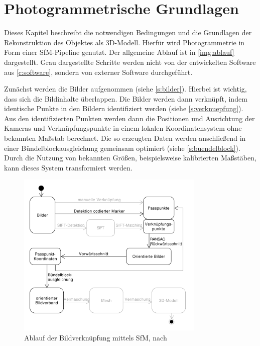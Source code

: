 \documentclass[./00PhotoBox.tex]{subfiles}
\begin{document}
\chapter{Photogrammetrische Grundlagen}
\label{c:photogrammetrie}
Dieses Kapitel beschreibt die notwendigen Bedingungen und die Grundlagen der Rekonstruktion des Objektes als 3D-Modell. Hierfür wird Photogrammetrie in Form einer \Gls{SfM}-Pipeline genutzt. Der allgemeine Ablauf ist in \autoref{img:ablauf} dargestellt. Grau dargestellte Schritte werden nicht von der entwickelten Software aus \autoref{c:software}, sondern von externer Software durchgeführt.

Zunächst werden die Bilder aufgenommen (siehe \autoref{s:bilder}). Hierbei ist wichtig, dass sich die Bildinhalte überlappen. Die Bilder werden dann verknüpft, indem identische Punkte in den Bildern identifiziert werden  (siehe \autoref{s:verknuepfung}).
Aus den identifizierten Punkten werden dann die Positionen und Ausrichtung der Kameras und Verknüpfungspunkte in einem lokalen Koordinatensystem ohne bekannten Maßstab berechnet. Die so erzeugten Daten werden anschließend in einer Bündelblockausgleichung gemeinsam optimiert (siehe \autoref{s:buendelblock}). Durch die Nutzung von bekannten Größen, beispielsweise kalibrierten Maßstäben, kann dieses System transformiert werden.

\begin{figure}
    \centering
    \includegraphics[width=0.8\textwidth]{./img/uml/uml_ablauf.pdf}
    \caption{Ablauf der Bildverknüpfung mittels \acrfull{SfM}, nach \citealt[S. 492]{luhmann}} %
    \label{img:ablauf} %
\end{figure}
\end{document}
